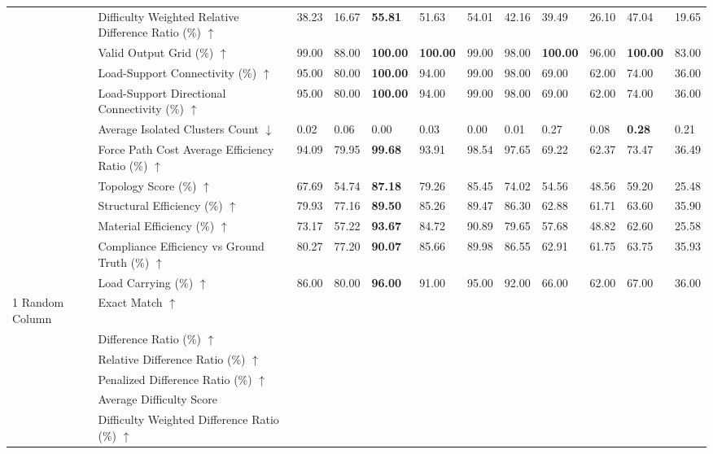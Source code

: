 \begin{table}[!h]
{\begin{tabular}{llllllllllll}
 & Difficulty Weighted Relative Difference Ratio (\%) $\uparrow$ & 38.23 & 16.67 & \textbf{55.81} & 51.63 & 54.01 & 42.16 & 39.49 & 26.10 & 47.04 & 19.65 \\
 & Valid Output Grid (\%) $\uparrow$ & 99.00 & 88.00 & \textbf{100.00} & \textbf{100.00} & 99.00 & 98.00 & \textbf{100.00} & 96.00 & \textbf{100.00} & 83.00 \\
 & Load-Support Connectivity (\%) $\uparrow$ & 95.00 & 80.00 & \textbf{100.00} & 94.00 & 99.00 & 98.00 & 69.00 & 62.00 & 74.00 & 36.00 \\
 & Load-Support Directional Connectivity (\%) $\uparrow$ & 95.00 & 80.00 & \textbf{100.00} & 94.00 & 99.00 & 98.00 & 69.00 & 62.00 & 74.00 & 36.00 \\
 & Average Isolated Clusters Count $\downarrow$ & 0.02 & 0.06 & 0.00 & 0.03 & 0.00 & 0.01 & 0.27 & 0.08 & \textbf{0.28} & 0.21 \\
 & Force Path Cost Average Efficiency Ratio (\%) $\uparrow$ & 94.09 & 79.95 & \textbf{99.68} & 93.91 & 98.54 & 97.65 & 69.22 & 62.37 & 73.47 & 36.49 \\
 & Topology Score (\%) $\uparrow$ & 67.69 & 54.74 & \textbf{87.18} & 79.26 & 85.45 & 74.02 & 54.56 & 48.56 & 59.20 & 25.48 \\
 & Structural Efficiency (\%) $\uparrow$ & 79.93 & 77.16 & \textbf{89.50} & 85.26 & 89.47 & 86.30 & 62.88 & 61.71 & 63.60 & 35.90 \\
 & Material Efficiency (\%) $\uparrow$ & 73.17 & 57.22 & \textbf{93.67} & 84.72 & 90.89 & 79.65 & 57.68 & 48.82 & 62.60 & 25.58 \\
 & Compliance Efficiency vs Ground Truth (\%) $\uparrow$ & 80.27 & 77.20 & \textbf{90.07} & 85.66 & 89.98 & 86.55 & 62.91 & 61.75 & 63.75 & 35.93 \\
 & Load Carrying (\%) $\uparrow$ & 86.00 & 80.00 & \textbf{96.00} & 91.00 & 95.00 & 92.00 & 66.00 & 62.00 & 67.00 & 36.00 \\
1 Random Column & Exact Match $\uparrow$ &  &  &  &  &  &  &  &  &  &  \\
 & Difference Ratio (\%) $\uparrow$ &  &  &  &  &  &  &  &  &  &  \\
 & Relative Difference Ratio (\%) $\uparrow$ &  &  &  &  &  &  &  &  &  &  \\
 & Penalized Difference Ratio (\%) $\uparrow$ &  &  &  &  &  &  &  &  &  &  \\
 & Average Difficulty Score &  &  &  &  &  &  &  &  &  &  \\
 & Difficulty Weighted Difference Ratio (\%) $\uparrow$ &  &  &  &  &  &  &  &  &  &  \\

\end{tabular}}
\end{table}
